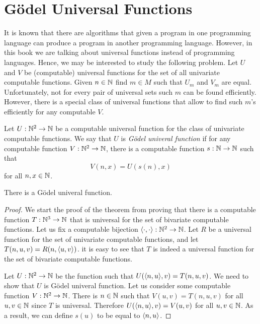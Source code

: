 \chapter{G\"odel Universal Functions}
It is known that there are algorithms that given a program in one programming
language can produce a program in another programming language.
However, in this book we are talking about universal functions instead of
programming languages. Hence, we may be interested to study the following
problem. Let $U$ and $V$ be (computable) universal functions for the set of all
univariate computable functions. Given $n \in {\mathbb{N}}$ find $m \in M$ such that $U_m$
and $V_m$ are equal. Unfortunately, not for every pair of universal sets such
$m$ can be found efficiently. However, there is a special class of universal
functions that allow to find such $m$'s efficiently for any computable $V$.
\begin{definition}
  Let $U : {\mathbb{N}}^2 \to {\mathbb{N}}$ be a computable universal function for the class of
  univariate computable functions. We say that $U$ is \emph{G\"odel univeral
  function} if for any computable function $V : {\mathbb{N}}^2 \to {\mathbb{N}}$, there is a
  computable function $s : {\mathbb{N}} \to {\mathbb{N}}$ such that 
  \[
    V(n, x) = U(s(n), x)
  \]
  for all $n, x \in {\mathbb{N}}$.
\end{definition}

\begin{theorem}
  There is a G\"odel univeral function.
\end{theorem}

\begin{proof}
  We start the proof of the theorem from proving that there is a computable
  function $T : {\mathbb{N}}^3 \to {\mathbb{N}}$ that is universal for the set of bivariate
  computable functions. Let us fix a computable bijection 
  $\langle {\cdot}, {\cdot} \rangle : {\mathbb{N}}^2 \to {\mathbb{N}}$. Let $R$ be a universal function for the set of
  univariate computable functions, and let $T(n, u, v) = R(n, \langle {u}, {v} \rangle)$.
  it is easy to see that $T$ is indeed a universal function for the set of
  bivariate computable functions.

  Let $U : {\mathbb{N}}^2 \to {\mathbb{N}}$ be the function such that $U(\langle {n}, {u} \rangle, v) = 
  T(n, u, v)$. We need to show that $U$ is G\"odel univeral function.
  Let us consider some computable function $V : {\mathbb{N}}^2 \to {\mathbb{N}}$. There is $n \in
  {\mathbb{N}}$ such that $V(u, v) = T(n, u, v)$ for all $u, v \in {\mathbb{N}}$ since $T$ is
  universal. Therefore $U(\langle {n}, {u} \rangle, v) = V(u, v)$ for all $u, v \in {\mathbb{N}}$.
  As a result, we can define $s(u)$ to be equal to $\langle {n}, {u} \rangle$.
\end{proof}

